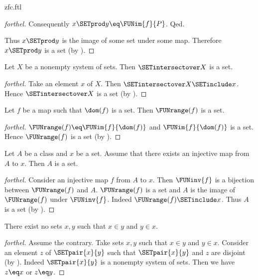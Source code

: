 \documentclass{naproche-library}
\begin{document}
\begin{smodule}[title=ZFC]{zfc.ftl}
\begin{proof}[forthel]
    Consequently $x \SETprod y \eq \FUNim{f}{P}$.
  Qed.

  Thus $x \SETprod y$ is the image of some set under some map.
  Therefore $x \SETprod y$ is a set (by ).
\end{proof}

\begin{proposition}[forthel,id=FOUNDATIONS_10_5486815207227392]
  Let $X$ be a nonempty system of sets.
  Then $\SETintersectover X$ is a set.
\end{proposition}
\begin{proof}[forthel]
  Take an element $x$ of $X$.
  Then $\SETintersectover X \SETinclude x$.
  Hence $\SETintersectover X$ is a set (by ).
\end{proof}

\begin{proposition}[forthel,id=FOUNDATIONS_10_7598384349184000]
  Let $f$ be a map such that $\dom(f)$ is a set.
  Then $\FUNrange(f)$ is a set.
\end{proposition}
\begin{proof}[forthel]
  $\FUNrange(f) \eq \FUNim{f}{\dom(f)}$ and $\FUNim{f}{\dom(f)}$ is a set.
  Hence $\FUNrange(f)$ is a set (by ).
\end{proof}

\begin{proposition}[forthel,id=FOUNDATIONS_10_8631339572002816]
  Let $A$ be a class and $x$ be a set.
  Assume that there exists an injective map from $A$ to $x$.
  Then $A$ is a set.
\end{proposition}
\begin{proof}[forthel]
  Consider an injective map $f$ from $A$ to $x$.
  Then $\FUNinv{f}$ is a bijection between $\FUNrange(f)$ and $A$.
  $\FUNrange(f)$ is a set and $A$ is the image of $\FUNrange(f)$ under $\FUNinv{f}$.
  Indeed $\FUNrange(f) \SETinclude x$.
  Thus $A$ is a set (by ).
\end{proof}

\begin{proposition}[forthel,id=FOUNDATIONS_10_8812282138066944]
  There exist no sets $x, y$ such that $x \in y$ and $y \in x$.
\end{proposition}
\begin{proof}[forthel]
  Assume the contrary.
  Take sets $x,y$ such that $x \in y$ and $y \in x$.
  Consider an element $z$ of $\SETpair{x}{y}$ such that $\SETpair{x}{y}$ and $z$ are disjoint (by ).
  Indeed $\SETpair{x}{y}$ is a nonempty system of sets.
  Then we have $z \eq x$ or $z \eq y$.


\end{proof}
\end{smodule}
\end{document}
